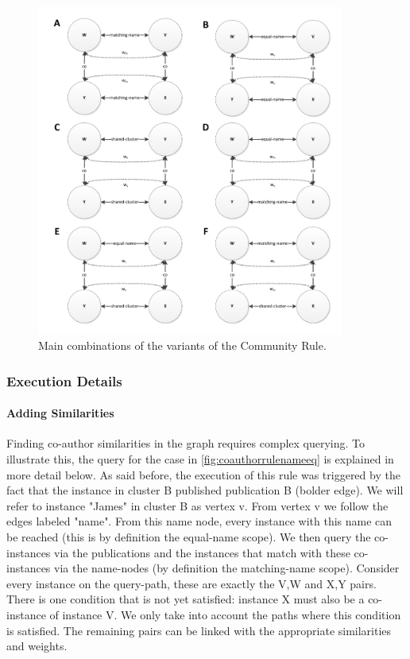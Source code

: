 \begin{figure}[h!]
	\centering
		\includegraphics[width=0.9\textwidth]{fig/coauthorrulecases}
	\caption{Main combinations of the variants of the Community Rule.}
	\label{fig:coauthorrulecases}
\end{figure}

\subsubsection{Execution Details}

\paragraph{Adding Similarities} Finding co-author similarities in the graph requires complex querying. To illustrate this, the query for the case in \autoref{fig:coauthorrulenameeq} is explained in more detail below. As said before, the execution of this rule was triggered by the fact that the instance in cluster B published publication B (bolder edge). We will refer to instance "James" in cluster B as vertex v. From vertex v we follow the edges labeled "name". From this name node, every instance with this name can be reached (this is by definition the equal-name scope). We then query the co-instances via the publications and the instances that match with these co-instances via the name-nodes (by definition the matching-name scope). Consider every instance on the query-path, these are exactly the V,W and X,Y pairs. There is one condition that is not yet satisfied: instance X must also be a co-instance of instance V. We only take into account the paths where this condition is satisfied. The remaining pairs can be linked with the appropriate similarities and weights.

